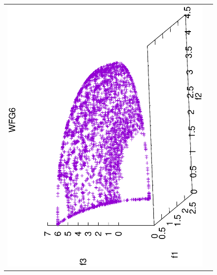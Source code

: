 \begin{figure}[H]
\begin{tabular}{cc}
  \includegraphics[scale=0.3, angle=-90,origin=c]{Figures_Chapter7/Results_Chapter4/Summary_Representative/VSD-MOEA/WFG6.eps} &

\end{tabular}
\end{figure}
